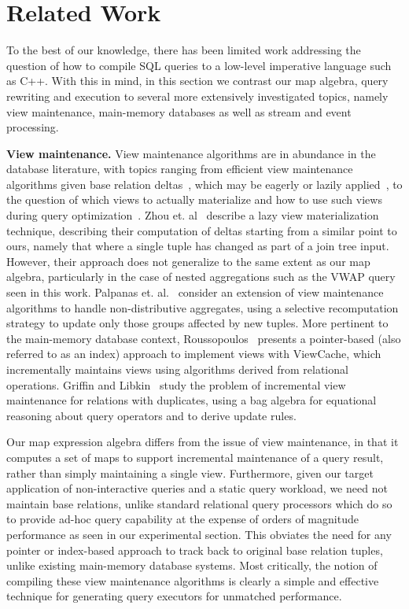 \section{Related Work}

To the best of our knowledge, there has been limited work addressing the question
of how to compile SQL queries to a low-level imperative language such as C++.
With this in mind, in this section we contrast our map algebra, query rewriting
and execution to several more extensively investigated topics, namely view
maintenance, main-memory databases as well as stream and event processing.

\textbf{View maintenance.}
View maintenance algorithms are in abundance in the database literature, with
topics ranging from efficient view maintenance algorithms given base relation
deltas~\cite{colby-sigmod:96}, which may be eagerly or lazily
applied~\cite{yan-vldb:95,zhou-vldb:07}, to the question of which views to
actually materialize and how to use such views during query
optimization~\cite{kotidis-tods:01,zhou-icde:07}. Zhou et. al~\cite{zhou-vldb:07}
describe a lazy view materialization technique, describing their computation of
deltas starting from a similar point to ours, namely that where a single tuple
has changed as part of a join tree input. However, their approach does not
generalize to the same extent as our map algebra, particularly in the case of
nested aggregations such as the VWAP query seen in this work. Palpanas et.
al.~\cite{palpanas-vldb:02} consider an extension of view maintenance algorithms
to handle non-distributive aggregates, using a selective recomputation strategy
to update only those groups affected by new tuples. More pertinent to the
main-memory database context, Roussopoulos~\cite{roussopoulos-tods:91} presents a
pointer-based (also referred to as an index) approach to implement views with
ViewCache, which incrementally maintains views using algorithms derived from
relational operations. Griffin and Libkin~\cite{griffin-sigmod:95} study the
problem of incremental view maintenance for relations with duplicates, using a
bag algebra for equational reasoning about query operators and to derive update
rules.

Our map expression algebra differs from the issue of view maintenance, in that it
computes a set of maps to support incremental maintenance of a query result,
rather than simply maintaining a single view.
Furthermore, given our target application of non-interactive queries and a static
query workload, we need not maintain base relations, unlike standard relational
query processors which do so to provide ad-hoc query capability at the expense of
orders of magnitude performance as seen in our experimental section. This
obviates the need for any pointer or index-based approach to track back to
original base relation tuples, unlike existing main-memory database systems. Most
critically, the notion of compiling these view maintenance algorithms is clearly
a simple and effective technique for generating query executors for unmatched
performance.

